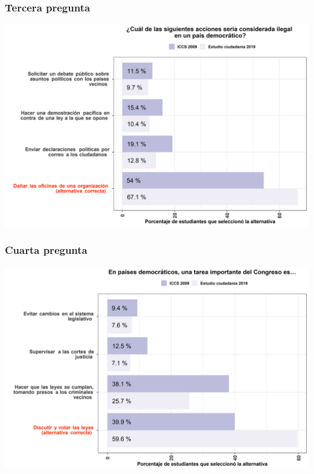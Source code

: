 \documentclass[
  14pt,
]{book}
\begin{document}
\hypertarget{tercera-pregunta-1}{%
\subsubsection{Tercera pregunta}\label{tercera-pregunta-1}}

\begin{center}\includegraphics[width=52.49in]{images/graph_p3} \end{center}

\hypertarget{cuarta-pregunta-1}{%
\subsubsection{Cuarta pregunta}\label{cuarta-pregunta-1}}

\begin{center}\includegraphics[width=52.49in]{images/graph_p4} \end{center}
\end{document}
